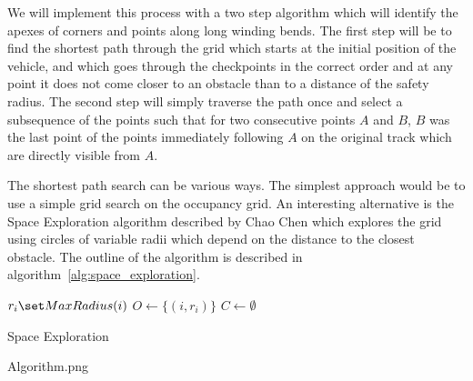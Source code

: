 
We will implement this process with a two step algorithm which will identify the apexes of corners and points along long winding bends. The first step will be to find the shortest path through the grid which starts at the initial position of the vehicle, and which goes through the checkpoints in the correct order and at any point it does not come closer to an obstacle than to a distance of the safety radius. The second step will simply traverse the path once and select a subsequence of the points such that for two consecutive points $A$ and $B$, $B$ was the last point of the points immediately following $A$ on the original track which are directly visible from $A$.

The shortest path search can be various ways. The simplest approach would be to use a simple grid search on the occupancy grid. An interesting alternative is the Space Exploration algorithm described by Chao Chen \cite{SEHS} which explores the grid using circles of variable radii which depend on the distance to the closest obstacle. The outline of the algorithm is described in algorithm~\ref{alg:space_exploration}.

\begin{algorithm}[]
\SetAlgoLined
{}
 $r_i\set MaxRadius(i)$\;
 $O\gets\{(i, r_i)\}$\;
 $C\gets\emptyset$\;
 \caption{Space Exploration}
 \label{alg:space_exploration}
\end{algorithm}

Algorithm.png 



